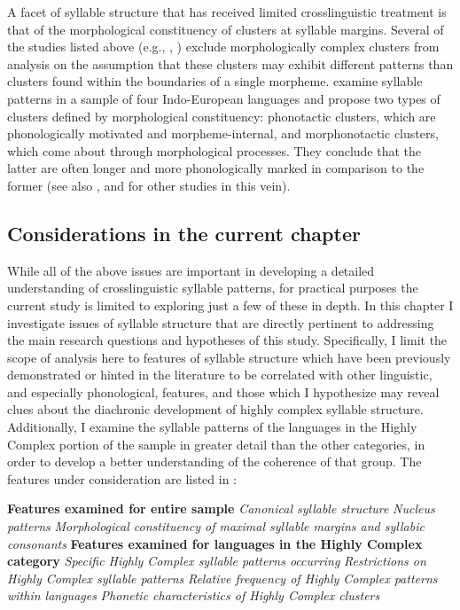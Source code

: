   A facet of syllable structure that has received limited crosslinguistic treatment is that of the morphological constituency of clusters at syllable margins. Several of the studies listed above (e.g., \citealt{Greenberg19651978}, \citealt{Morelli1999,Kreitman2008}) exclude morphologically complex clusters from analysis on the assumption that these clusters may exhibit different patterns than clusters found within the boundaries of a single morpheme. \citet{DresslerDziubalska-Kołaczyk2006} examine syllable patterns in a sample of four Indo-European languages and propose two types of clusters defined by morphological constituency: phonotactic clusters, which are phonologically motivated and morpheme-internal, and morphonotactic clusters, which come about through morphological processes. They conclude that the latter are often longer and more phonologically marked in comparison to the former (see also \citealt{DresslerEtAl2010,Orzechowska2012}, and \citealt{DresslerEtAl2015} for other studies in this vein).

\subsection{Considerations in the current chapter}\label{sec:3.1.2}

  While all of the above issues are important in developing a detailed understanding of crosslinguistic syllable patterns, for practical purposes the current study is limited to exploring just a few of these in depth. In this chapter I investigate issues of syllable structure that are directly pertinent to addressing the main research questions and hypotheses of this study. Specifically, I limit the scope of analysis here to features of syllable structure which have been previously demonstrated or hinted in the literature to be correlated with other linguistic, and especially phonological, features, and those which I hypothesize may reveal clues about the diachronic development of highly complex syllable structure. Additionally, I examine the syllable patterns of the languages in the Highly Complex portion of the sample in greater detail than the other categories, in order to develop a better understanding of the coherence of that group. The features under consideration are listed in :

\ea\label{ex:3.1}
   \textbf{Features examined for entire sample}
\ea   \textit{Canonical syllable structure}
\ex   \textit{Nucleus patterns}
\ex   \textit{Morphological constituency of maximal syllable margins and syllabic consonants}
\z
\z
\ea\label{ex:3.2}
   \textbf{Features examined for languages in the Highly Complex category}
\ea   \textit{Specific Highly Complex syllable patterns occurring}
\ex   \textit{Restrictions on Highly Complex syllable patterns}
\ex   \textit{Relative frequency of Highly Complex patterns within languages}
\ex   \textit{Phonetic characteristics of Highly Complex clusters}
\z
\z


